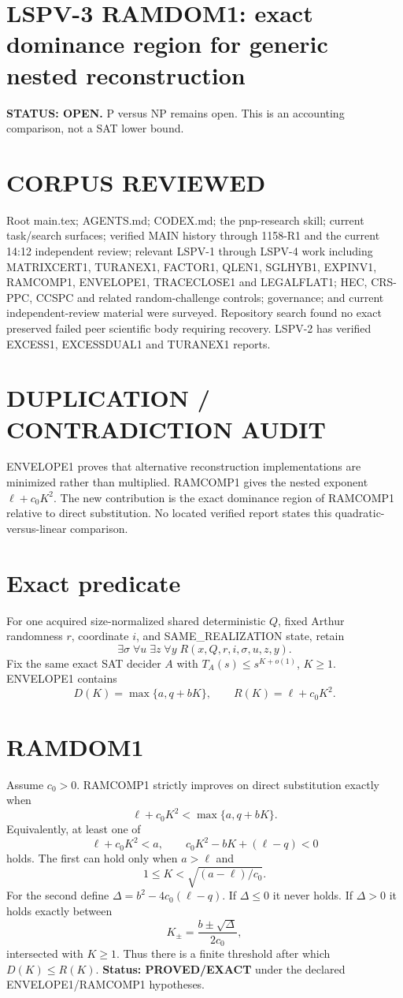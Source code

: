 \documentclass[11pt]{article}
\begin{document}
\section*{LSPV-3 RAMDOM1: exact dominance region for generic nested reconstruction}
\textbf{STATUS: OPEN.} P versus NP remains open. This is an accounting comparison, not a SAT lower bound.

\section*{CORPUS REVIEWED}
Root main.tex; AGENTS.md; CODEX.md; the pnp-research skill; current task/search surfaces; verified MAIN history through 1158-R1 and the current 14:12 independent review; relevant LSPV-1 through LSPV-4 work including MATRIXCERT1, TURANEX1, FACTOR1, QLEN1, SGLHYB1, EXPINV1, RAMCOMP1, ENVELOPE1, TRACECLOSE1 and LEGALFLAT1; HEC, CRS-PPC, CCSPC and related random-challenge controls; governance; and current independent-review material were surveyed. Repository search found no exact preserved failed peer scientific body requiring recovery. LSPV-2 has verified EXCESS1, EXCESSDUAL1 and TURANEX1 reports.

\section*{DUPLICATION / CONTRADICTION AUDIT}
ENVELOPE1 proves that alternative reconstruction implementations are minimized rather than multiplied. RAMCOMP1 gives the nested exponent $\ell+c_0K^2$. The new contribution is the exact dominance region of RAMCOMP1 relative to direct substitution. No located verified report states this quadratic-versus-linear comparison.

\section*{Exact predicate}
For one acquired size-normalized shared deterministic $Q$, fixed Arthur randomness $r$, coordinate $i$, and SAME\_REALIZATION state, retain
\[
\exists\sigma\;\forall u\;\exists z\;\forall y\;R(x,Q,r,i,\sigma,u,z,y).
\]
Fix the same exact SAT decider $A$ with $T_A(s)\le s^{K+o(1)}$, $K\ge1$. ENVELOPE1 contains
\[
D(K)=\max\{a,q+bK\},\qquad R(K)=\ell+c_0K^2.
\]

\section*{RAMDOM1}
Assume $c_0>0$. RAMCOMP1 strictly improves on direct substitution exactly when
\[
\boxed{\ell+c_0K^2<\max\{a,q+bK\}.}
\]
Equivalently, at least one of
\[
\ell+c_0K^2<a,\qquad c_0K^2-bK+(\ell-q)<0
\]
holds. The first can hold only when $a>\ell$ and
\[
1\le K<\sqrt{(a-\ell)/c_0}.
\]
For the second define $\Delta=b^2-4c_0(\ell-q)$. If $\Delta\le0$ it never holds. If $\Delta>0$ it holds exactly between
\[
K_\pm=\frac{b\pm\sqrt{\Delta}}{2c_0},
\]
intersected with $K\ge1$. Thus there is a finite threshold after which $D(K)\le R(K)$.
\textbf{Status: PROVED/EXACT} under the declared ENVELOPE1/RAMCOMP1 hypotheses.
\end{document}
